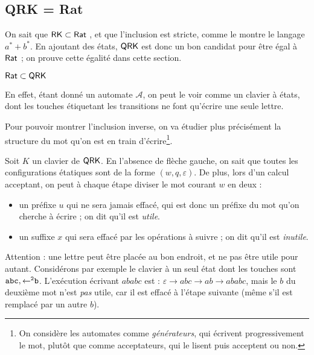\documentclass[12pt, a4paper]{article}
\newcommand{\A}{\mathcal{A}}
\begin{document}
    \subsection{QRK = Rat}\label{sectionclavetats}
    On sait que $\mathsf{RK} \subset \mathsf{Rat}$ \autocite[théorèmes~101/102]{bible}, et que l'inclusion est stricte, comme le montre le langage $a^* + b^*$. En ajoutant des états,
    $\mathsf{QRK}$ est donc un bon candidat pour être égal à $\mathsf{Rat}$ ; on prouve cette égalité dans cette section.
    
    \begin{RatdansQRK}
        $\mathsf{Rat} \subset \mathsf{QRK}$
    \end{RatdansQRK}
    En effet, étant donné un automate $\A$, on peut le voir comme un clavier à états, dont les touches étiquetant les transitions 
    ne font qu'écrire une seule lettre.
    


    Pour pouvoir montrer l'inclusion inverse, on va étudier plus précisément la structure du mot qu'on est en train d'écrire\footnote{On considère les automates comme \emph{générateurs}, qui écrivent progressivement le mot, plutôt que comme acceptateurs, qui le lisent puis acceptent ou non.}.
    
    Soit $K$ un clavier de $\mathsf{QRK}$. En l'absence de flèche gauche, on sait que toutes les configurations étatiques sont de la forme $(w,q,\varepsilon)$. De plus, lors d'un calcul acceptant, on peut à chaque étape diviser le mot courant $w$ en deux :
    \begin{itemize}
        \item un préfixe $u$ qui ne sera jamais effacé, qui est donc un préfixe du mot qu'on cherche à écrire ; on dit qu'il est \emph{utile}.
        \item un suffixe $x$ qui sera effacé par les opérations à suivre ; on dit qu'il est \emph{inutile}.
    \end{itemize}
    \begin{example}[Remarque]
        Attention : une lettre peut être placée au bon endroit, et ne pas être utile pour autant. Considérons par exemple le clavier à un seul état dont les touches sont $\mathtt{abc},\mathtt{\mathord{\leftarrow}^2b}$. 
    L'exécution écrivant $ababc$ est : $\varepsilon \rightarrow abc \rightarrow ab \rightarrow ababc$, mais le $b$ du deuxième mot n'est \emph{pas} utile, car il est effacé à l'étape suivante (même s'il est remplacé par un autre $b$). \smallskip
    \end{example}
    
\end{document}
